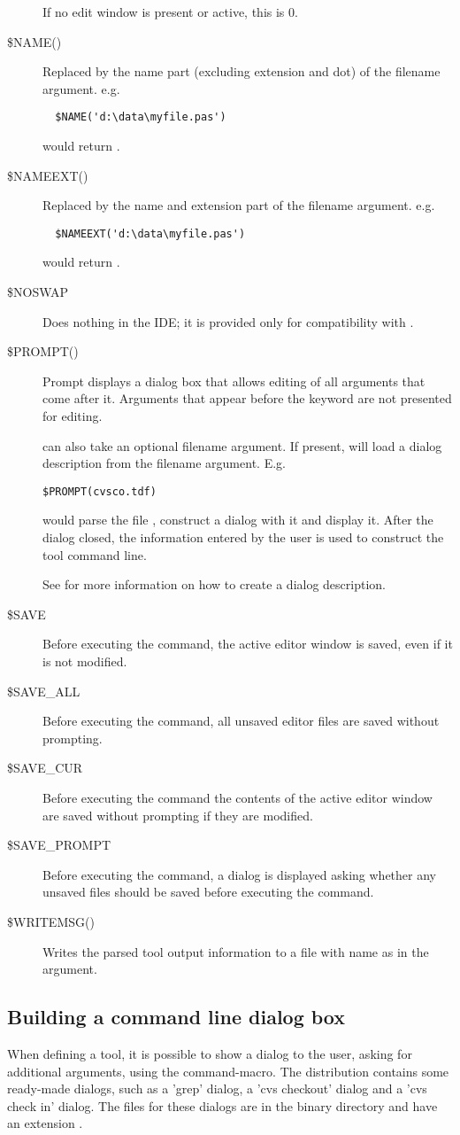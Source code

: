 \begin{description}
If no edit window is present or active, this is 0.
\item[\$NAME()]
Replaced by the name part (excluding extension and dot) of the filename
argument.
e.g.
\begin{verbatim}
  $NAME('d:\data\myfile.pas')
\end{verbatim}
would return .
\item[\$NAMEEXT()]
Replaced by the name and extension part of the filename argument.
e.g.
\begin{verbatim}
  $NAMEEXT('d:\data\myfile.pas')
\end{verbatim}
would return .
\item[\$NOSWAP]
Does nothing in the IDE; it is provided only for compatibility with \tp.
\item[\$PROMPT()]
Prompt displays a dialog box that allows editing of all arguments that
come after it. Arguments that appear before the  keyword
are not presented for editing.

 can also take an optional filename argument. If present,  will load
a dialog description from the filename argument. E.g.
\begin{verbatim}
$PROMPT(cvsco.tdf)
\end{verbatim}
would parse the file , construct a dialog with it and
display it. After the dialog closed, the information entered by the user
is used to construct the tool command line.

See  for more information on how to create a dialog
description.
\item[\$SAVE]
Before executing the command, the active editor window is saved, even if it is not modified.
\item[\$SAVE\_ALL]
Before executing the command, all unsaved editor files are saved without prompting.
\item[\$SAVE\_CUR]
Before executing the command the contents of the active editor window are
saved without prompting if they are modified.
\item[\$SAVE\_PROMPT]
Before executing the command, a dialog is displayed asking whether any
unsaved files should be saved before executing the command.
\item[\$WRITEMSG()]
Writes the parsed tool output information to a file with name as in the argument.
\end{description}	

\subsection{Building a command line dialog box}
\label{se:commanddialogs}
When defining a tool, it is possible to show a dialog to the user, asking for
additional arguments, using the  command-macro.
The \fpc distribution contains some ready-made dialogs, such as a 'grep' dialog, a 'cvs checkout' dialog
and a 'cvs check in' dialog. The files for these dialogs are in the binary
directory and have an extension .

